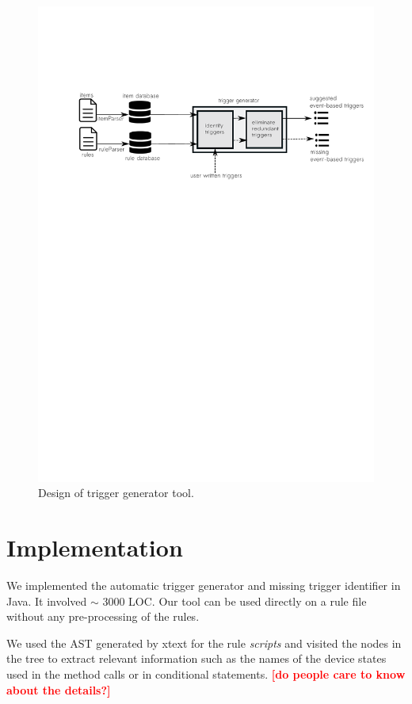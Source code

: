 \documentclass{sig-alternate-05-2015}
\newcommand\todo[1]{\textbf{\textcolor{red}{#1}}}
\begin{document}
\begin{figure}
\centering
\includegraphics [trim=0cm 18cm 0 5cm, scale=0.8]{images/design.pdf}
\caption{Design of trigger generator tool.}
\label{fig:design}
\end{figure} 

\section{Implementation}
We implemented the automatic trigger generator and missing trigger identifier in Java. It involved $\sim$ 3000 LOC. Our tool can be used directly on a rule file without any pre-processing of the rules. 

We used the AST generated by xtext for the rule \textit{scripts} and visited the nodes in the tree to extract relevant information such as the names of the device states used in the method calls or in conditional statements. 
\todo{[do people care to know about the details?]}
 
\end{document}
